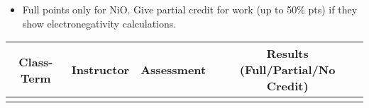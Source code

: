 \begin{rubric}

\begin{itemize}
	\item Full points only for NiO. Give partial credit for work (up to 50\% pts) if they show electronegativity calculations.
\end{itemize}

\end{rubric}

\begin{outcomes}
	\begin{center}
		\begin{tabular}{cccc}
			\hline\hline
                Class-Term & Instructor & Assessment & Results (Full/Partial/No Credit) \\
			\hline
                 &  &  &  \\
			\hline
		\end{tabular}
	\end{center}
\end{outcomes}

\begin{comments}

	
\end{comments}